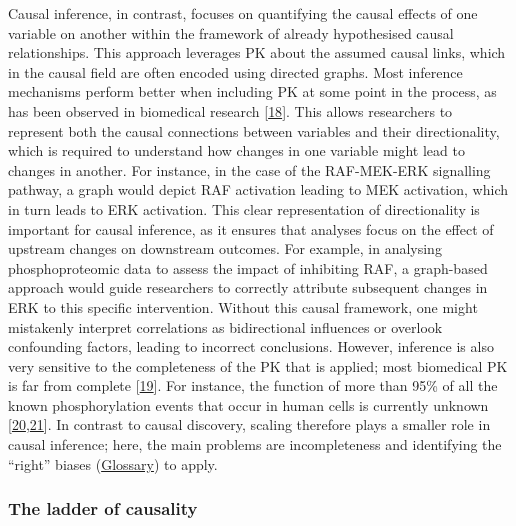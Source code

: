 Causal inference, in contrast, focuses on quantifying the causal effects of one variable on another within the framework of already hypothesised causal relationships.
This approach leverages PK about the assumed causal links, which in the causal field are often encoded using directed graphs.
Most inference mechanisms perform better when including PK at some point in the process, as has been observed in biomedical research {[}\protect\hyperlink{ref-qpg6x7P4}{18}{]}.
This allows researchers to represent both the causal connections between variables and their directionality, which is required to understand how changes in one variable might lead to changes in another.
For instance, in the case of the RAF-MEK-ERK signalling pathway, a graph would depict RAF activation leading to MEK activation, which in turn leads to ERK activation.
This clear representation of directionality is important for causal inference, as it ensures that analyses focus on the effect of upstream changes on downstream outcomes.
For example, in analysing phosphoproteomic data to assess the impact of inhibiting RAF, a graph-based approach would guide researchers to correctly attribute subsequent changes in ERK to this specific intervention.
Without this causal framework, one might mistakenly interpret correlations as bidirectional influences or overlook confounding factors, leading to incorrect conclusions.
However, inference is also very sensitive to the completeness of the PK that is applied; most biomedical PK is far from complete {[}\protect\hyperlink{ref-TUhGg6tD}{19}{]}.
For instance, the function of more than 95\% of all the known phosphorylation events that occur in human cells is currently unknown {[}\protect\hyperlink{ref-4VxTzwTj}{20},\protect\hyperlink{ref-yCFobrFQ}{21}{]}.
In contrast to causal discovery, scaling therefore plays a smaller role in causal inference; here, the main problems are incompleteness and identifying the ``right'' biases (\protect\hyperlink{bias-machine-learning}{Glossary}) to apply.

\hypertarget{the-ladder-of-causality}{%
\subsubsection{The ladder of causality}\label{the-ladder-of-causality}}

